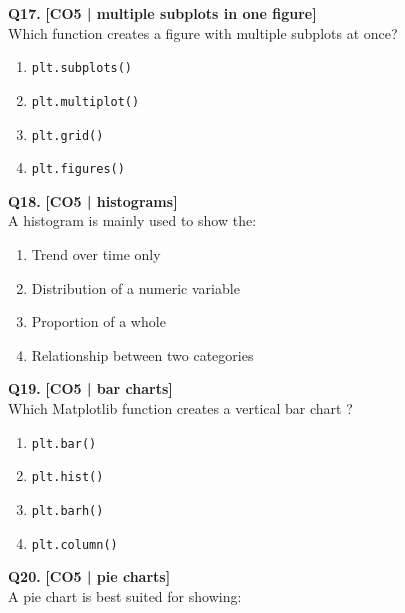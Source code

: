 \noindent\textbf{Q17.} \hfill {\small\color{LPUOrange}\textbf{[CO5 | multiple subplots in one figure]}}\\[2pt]
Which function creates a figure with multiple subplots at once?

\begin{enumerate}[label=(\alph*),topsep=2pt,itemsep=1pt,partopsep=0pt,parsep=0pt]
    \item \relax \texttt{plt.subplots()}
    \item \relax \texttt{plt.multiplot()}
    \item \relax \texttt{plt.grid()}
    \item \relax \texttt{plt.figures()}
\end{enumerate}
\vspace{{2mm}}

\noindent\textbf{Q18.} \hfill {\small\color{LPUOrange}\textbf{[CO5 | histograms]}}\\[2pt]
A histogram is mainly used to show the:

\begin{enumerate}[label=(\alph*),topsep=2pt,itemsep=1pt,partopsep=0pt,parsep=0pt]
    \item \relax Trend over time only
    \item \relax Distribution of a numeric variable
    \item \relax Proportion of a whole
    \item \relax Relationship between two categories
\end{enumerate}
\vspace{{2mm}}

\noindent\textbf{Q19.} \hfill {\small\color{LPUOrange}\textbf{[CO5 | bar charts]}}\\[2pt]
Which Matplotlib function creates a vertical bar chart ?

\begin{enumerate}[label=(\alph*),topsep=2pt,itemsep=1pt,partopsep=0pt,parsep=0pt]
    \item \relax \texttt{plt.bar()}
    \item \relax \texttt{plt.hist()}
    \item \relax \texttt{plt.barh()}
    \item \relax \texttt{plt.column()}
\end{enumerate}
\vspace{{2mm}}

\noindent\textbf{Q20.} \hfill {\small\color{LPUOrange}\textbf{[CO5 | pie charts]}}\\[2pt]
A pie chart is best suited for showing:

